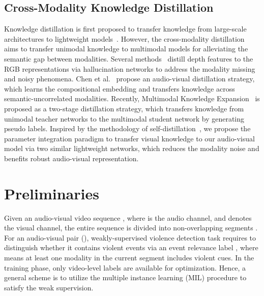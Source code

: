 \documentclass[sigconf]{acmart}
\begin{document}
\subsection{Cross-Modality Knowledge Distillation} 
Knowledge distillation is first proposed to transfer knowledge from large-scale architectures to lightweight models~\cite{hinton2015distilling, bucilu2006model}. However, the cross-modality distillation aims to transfer unimodal knowledge to multimodal models for alleviating the semantic gap between modalities. Several methods~\cite{garcia2018modality, hoffman2016learning} distill depth features to the RGB representations via hallucination networks to address the modality missing and noisy phenomena. Chen et al.~\cite{chen2021distilling} propose an audio-visual distillation strategy, which learns the compositional embedding and transfers knowledge across semantic-uncorrelated modalities. Recently, Multimodal Knowledge Expansion~\cite{xue2021multimodal} is proposed as a two-stage distillation strategy, which transfers knowledge from unimodal teacher networks to the multimodal student network by generating pseudo labels. Inspired by the methodology of self-distillation~\cite{fang2021seed, caron2021emerging, chen2020big, xie2020self, tian2019contrastive1, chen2021wasserstein}, we propose the parameter integration paradigm to transfer visual knowledge to our audio-visual model via two similar lightweight networks, which reduces the modality noise and benefits robust audio-visual representation.

\section{Preliminaries}

Given an audio-visual video sequence , where  is the audio channel, and  denotes the visual channel, the entire sequence is divided into  non-overlapping segments . For an audio-visual pair (), weakly-supervised violence detection task requires to distinguish whether it contains violent events via an event relevance label , where  means at least one modality in the current segment includes violent cues. In the training phase, only video-level labels  are available for optimization. Hence, a general scheme is to utilize the multiple instance learning (MIL) procedure to satisfy the weak supervision.
\end{document}
